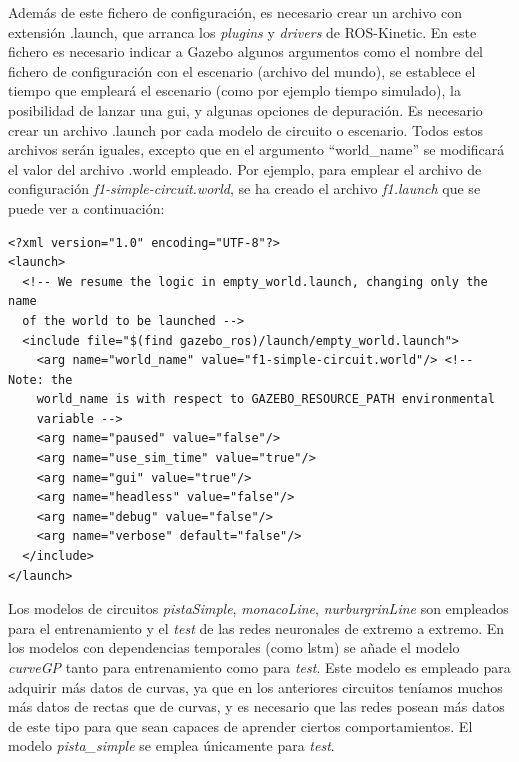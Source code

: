Además de este fichero de configuración, es necesario crear un archivo con extensión .launch, que arranca los \textit{plugins} y \textit{drivers} de ROS-Kinetic. En este fichero es necesario indicar a Gazebo algunos argumentos como el nombre del fichero de configuración con el escenario (archivo del mundo), se establece el tiempo que empleará el escenario (como por ejemplo tiempo simulado), la posibilidad de lanzar una \acrshort{gui}, y algunas opciones de depuración. Es necesario crear un archivo .launch por cada modelo de circuito o escenario. Todos estos archivos serán iguales, excepto que en el argumento ``world\_name'' se modificará el valor del archivo .world empleado. Por ejemplo, para emplear el archivo de configuración \textit{f1-simple-circuit.world}, se ha creado el archivo \textit{f1.launch} que se puede ver a continuación:\\

\vspace{20pt}
\begin{lstlisting}[frame=single]
<?xml version="1.0" encoding="UTF-8"?>
<launch>
  <!-- We resume the logic in empty_world.launch, changing only the name 
  of the world to be launched -->
  <include file="$(find gazebo_ros)/launch/empty_world.launch">
    <arg name="world_name" value="f1-simple-circuit.world"/> <!-- Note: the 
    world_name is with respect to GAZEBO_RESOURCE_PATH environmental
    variable -->
    <arg name="paused" value="false"/>
    <arg name="use_sim_time" value="true"/>
    <arg name="gui" value="true"/>
    <arg name="headless" value="false"/>
    <arg name="debug" value="false"/>
    <arg name="verbose" default="false"/>
  </include>  
</launch>
\end{lstlisting}

Los modelos de circuitos \textit{pistaSimple}, \textit{monacoLine}, \textit{nurburgrinLine} son empleados para el entrenamiento y el \textit{test} de las redes neuronales de extremo a extremo. En los modelos con dependencias temporales (como \acrshort{lstm}) se añade el modelo \textit{curveGP} tanto para entrenamiento como para \textit{test}. Este modelo es empleado para adquirir más datos de curvas, ya que en los anteriores circuitos teníamos muchos más datos de rectas que de curvas, y es necesario que las redes posean más datos de este tipo para que sean capaces de aprender ciertos comportamientos. El modelo \textit{pista\_simple} se emplea únicamente para \textit{test}.\\



